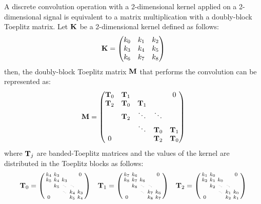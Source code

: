 A discrete convolution operation with a 2-dimensional kernel applied on a 2-dimensional signal is equivalent to a matrix multiplication with a doubly-block Toeplitz matrix.
Let $\mathbf{K}$ be a 2-dimensional kernel defined as follows:
\begin{equation*}
  \mathbf{K} = \begin{pmatrix}
    k_0 & k_1 & k_2 \\
    k_3 & k_4 & k_5 \\
    k_6 & k_7 & k_8 
  \end{pmatrix}
\end{equation*}
then, the doubly-block Toeplitz matrix $\mathbf{M}$ that performs the convolution can be represented as:
\begin{equation*}
  \mathbf{M} = \begin{pmatrix}
    \mathbf{T}_0 & \mathbf{T}_1 &         &         & 0       \\
    \mathbf{T}_2 & \mathbf{T}_0 & \mathbf{T}_1 &         &         \\
            & \mathbf{T}_2 & \ddots  & \ddots  &         \\
            &         & \ddots  & \mathbf{T}_0 & \mathbf{T}_1 \\
    0       &         &         & \mathbf{T}_2 & \mathbf{T}_0
  \end{pmatrix}
\end{equation*}
where $\mathbf{T}_j$ are banded-Toeplitz matrices and the values of the kernel are distributed in the Toeplitz blocks as follows:
\begin{equation*}
  \Tmat_0 = \leftmatrixsmall
    k_4 & k_3 &         &         & 0       \\
    k_5 & k_4 & k_3 &         &         \\
            & k_5 & \smallddots  & \smallddots  &         \\
            &         & \smallddots  & k_4 & k_3 \\
    0       &         &         & k_5 & k_4
  \rightmatrixsmall \quad 
  \hfill
  \Tmat_1 = \leftmatrixsmall
    k_7 & k_6 &         &         & 0       \\
    k_8 & k_7 & k_6 &         &         \\
            & k_8 & \smallddots  & \smallddots  &         \\
            &         & \smallddots  & k_7 & k_6 \\
    0       &         &         & k_8 & k_7 \\
  \rightmatrixsmall \quad
  \hfill
  \Tmat_2 = \leftmatrixsmall
    k_1 & k_0 &         &         & 0       \\
    k_2 & k_1 & k_0 &         &         \\
            & k_2 & \smallddots  & \smallddots  &         \\
            &         & \smallddots  & k_1 & k_0 \\
    0       &         &         & k_2 & k_1 \\
  \rightmatrixsmall
\end{equation*}


